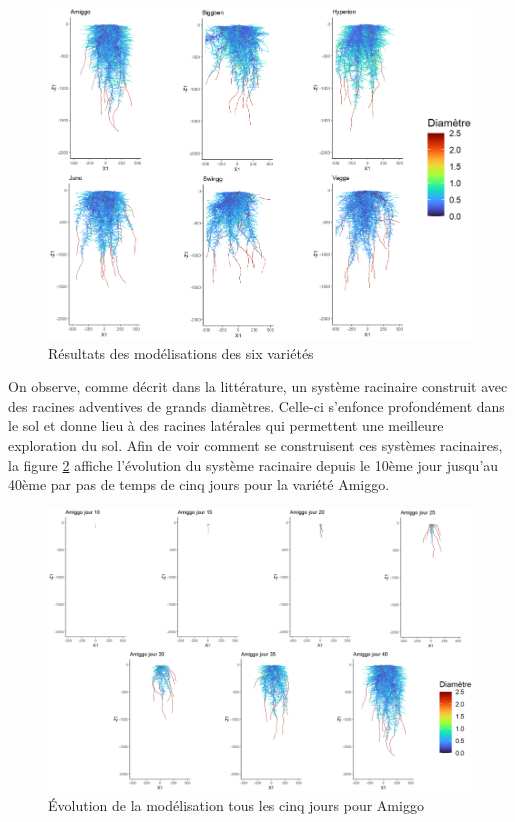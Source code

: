 \begin{figure}[ht]
\centering
\includegraphics[width=1\textwidth]{Image/roots.png}
\caption{Résultats des modélisations des six variétés}
\label{fig:roots}
\end{figure}

On observe, comme décrit dans la littérature, un système racinaire construit avec des racines adventives de grands diamètres.
Celle-ci s'enfonce profondément dans le sol et donne lieu à des racines latérales qui permettent une meilleure exploration du sol.
Afin de voir comment se construisent ces systèmes racinaires, la figure \ref{fig:roots_day} affiche l'évolution du système racinaire depuis le 10ème jour jusqu'au 40ème par pas de temps de cinq jours pour la variété Amiggo.
\newpage

\begin{figure}[ht]
\centering
\includegraphics[width=1\textwidth]{Image/root_day.png}
\caption{Évolution de la modélisation tous les cinq jours pour Amiggo}
\label{fig:roots_day}
\end{figure}

